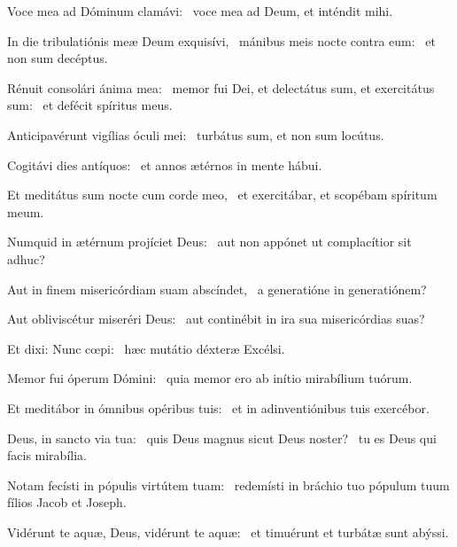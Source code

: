 \item Voce mea ad Dóminum clamávi:~\psstar{} voce mea ad Deum, et inténdit mihi.

\item In die tribulatiónis meæ Deum exquisívi,~\pscross{} mánibus meis nocte contra eum:~\psstar{} et non sum decéptus.

\item Rénuit consolári ánima mea:~\pscross{} memor fui Dei, et delectátus sum, et exercitátus sum:~\psstar{} et defécit spíritus meus.

\item Anticipavérunt vigílias óculi mei:~\psstar{} turbátus sum, et non sum locútus.

\item Cogitávi dies antíquos:~\psstar{} et annos ætérnos in mente hábui.

\item Et meditátus sum nocte cum corde meo,~\psstar{} et exercitábar, et scopébam spíritum meum.

\item Numquid in ætérnum projíciet Deus:~\psstar{} aut non appónet ut complacítior sit adhuc?

\item Aut in finem misericórdiam suam abscíndet,~\psstar{} a generatióne in generatiónem?

\item Aut obliviscétur miseréri Deus:~\psstar{} aut continébit in ira sua misericórdias suas?

\item Et dixi: Nunc cœpi:~\psstar{} hæc mutátio déxteræ Excélsi.

\item Memor fui óperum Dómini:~\psstar{} quia memor ero ab inítio mirabílium tuórum.

\item Et meditábor in ómnibus opéribus tuis:~\psstar{} et in adinventiónibus tuis exercébor.

\item Deus, in sancto via tua:~\pscross{} quis Deus magnus sicut Deus noster?~\psstar{} tu es Deus qui facis mirabília.

\item Notam fecísti in pópulis virtútem tuam:~\psstar{} redemísti in bráchio tuo pópulum tuum fílios Jacob et Joseph.

\item Vidérunt te aquæ, Deus, vidérunt te aquæ:~\psstar{} et timuérunt et turbátæ sunt abýssi.

